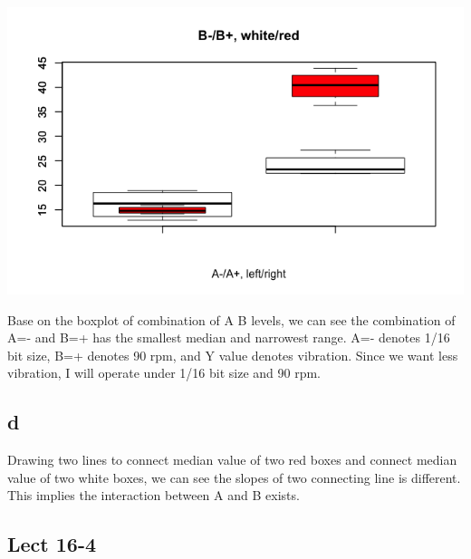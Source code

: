 \documentclass[11pt,letterpaper]{article}
\begin{document}
\includegraphics[scale=0.55]{lect-15-4-c-2.png}

\noindent Base on the boxplot of combination of A B levels, we can see the combination of A=- and B=+ has the smallest median and narrowest range. A=- denotes 1/16 bit size, B=+ denotes 90 rpm, and Y value denotes vibration. Since we want less vibration, I will operate under 1/16 bit size and 90 rpm. \\

\subsection*{d}
\noindent Drawing two lines to connect median value of two red boxes and connect median value of two white boxes, we can see the slopes of two connecting line is different. This implies the interaction between A and B exists. 
\newpage
\subsection*{Lect 16-4}
\end{document}
